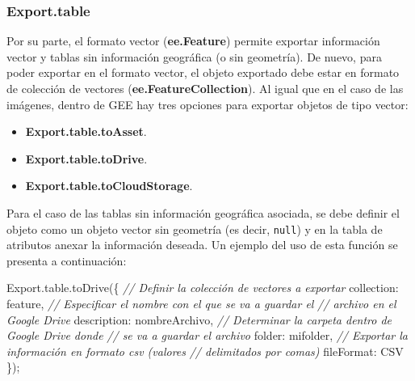 \documentclass[
  12pt,
  letterpaper,
  twoside]{book}
\newenvironment{Shaded}{\begin{snugshade}}{\end{snugshade}}
\newcommand{\AttributeTok}[1]{\textcolor[rgb]{0.48,0.12,0.64}{#1}}
\newcommand{\CommentTok}[1]{\textcolor[rgb]{0.24,0.58,0.00}{\textit{#1}}}
\newcommand{\DataTypeTok}[1]{\textcolor[rgb]{0.00,0.00,0.00}{#1}}
\newcommand{\FunctionTok}[1]{\textcolor[rgb]{0.48,0.12,0.64}{#1}}
\newcommand{\NormalTok}[1]{#1}
\newcommand{\OperatorTok}[1]{\textcolor[rgb]{0.00,0.00,0.00}{#1}}
\newcommand{\StringTok}[1]{\textcolor[rgb]{0.87,0.29,0.22}{#1}}
\providecommand{\tightlist}{%
  \setlength{\itemsep}{0pt}\setlength{\parskip}{0pt}}
\newcommand\boldpurple[1]{\textcolor{darkpurple}{\textbf{#1}}}
\begin{document}
\hypertarget{export.table}{%
\subsubsection*{Export.table}\label{export.table}}

Por su parte, el formato vector (\boldpurple{ee.Feature}) permite exportar información vector y tablas sin información geográfica (o sin geometría). De nuevo, para poder exportar en el formato vector, el objeto exportado debe estar en formato de colección de vectores (\boldpurple{ee.FeatureCollection}). Al igual que en el caso de las imágenes, dentro de GEE hay tres opciones para exportar objetos de tipo vector:

\begin{itemize}
\tightlist
\item
  \boldpurple{Export.table.toAsset}.
\item
  \boldpurple{Export.table.toDrive}.
\item
  \boldpurple{Export.table.toCloudStorage}.
\end{itemize}

Para el caso de las tablas sin información geográfica asociada, se debe definir el objeto como un objeto vector sin geometría (es decir, \texttt{null}) y en la tabla de atributos anexar la información deseada. Un ejemplo del uso de esta función se presenta a continuación:

\begin{Shaded}
\begin{Highlighting}[]
\NormalTok{Export}\OperatorTok{.}\AttributeTok{table}\OperatorTok{.}\FunctionTok{toDrive}\NormalTok{(\{}
  \CommentTok{// Definir la colección de vectores a exportar}
  \DataTypeTok{collection}\OperatorTok{:}\NormalTok{ feature}\OperatorTok{,}
  \CommentTok{// Especificar el nombre con el que se va a guardar el }
  \CommentTok{// archivo en el Google Drive}
  \DataTypeTok{description}\OperatorTok{:} \StringTok{\textquotesingle{}nombreArchivo\textquotesingle{}}\OperatorTok{,}
  \CommentTok{// Determinar la carpeta dentro de Google Drive donde}
  \CommentTok{// se va a guardar el archivo}
  \DataTypeTok{folder}\OperatorTok{:} \StringTok{\textquotesingle{}mifolder\textquotesingle{}}\OperatorTok{,}
  \CommentTok{// Exportar la información en formato csv (valores }
  \CommentTok{// delimitados por comas)}
  \DataTypeTok{fileFormat}\OperatorTok{:} \StringTok{\textquotesingle{}CSV\textquotesingle{}}
\NormalTok{\})}\OperatorTok{;}
\end{Highlighting}
\end{Shaded}
\end{document}
